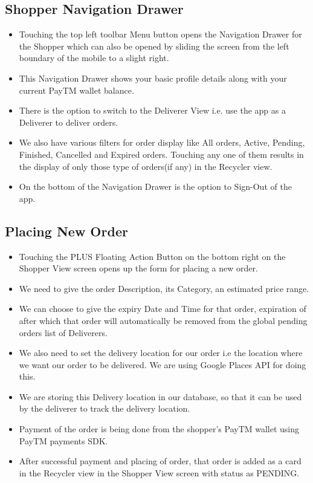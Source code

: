 \documentclass{report}
\begin{document}
\subsection{Shopper Navigation Drawer}
\begin{itemize}
\item Touching the top left toolbar Menu button opens the Navigation Drawer for the Shopper which can also be opened by sliding the screen from the left boundary of the mobile to a slight right.
\item This Navigation Drawer shows your basic profile details along with your current PayTM wallet balance.
\item There is the option to switch to the Deliverer View i.e. use the app as a Deliverer to deliver orders.
\item We also have various filters for order display like All orders, Active, Pending, Finished, Cancelled and Expired orders. Touching any one of them results in the display of only those type of orders(if any) in the Recycler view.
\item On the bottom of the Navigation Drawer is the option to Sign-Out of the app.
\end{itemize}

\subsection{Placing New Order}
\begin{itemize}
\item Touching the PLUS Floating Action Button on the bottom right on the Shopper View screen opens up the form for placing a new order.
\item We need to give the order Description, its Category, an estimated price range.
\item We can choose to give the expiry Date and Time for that order, expiration of after which that order will automatically be removed from the global pending orders list of Deliverers.
\item We also need to set the delivery location for our order i.e the location where we want our order to be delivered. We are using Google Places API for doing this.
\item We are storing this Delivery location in our database, so that it can be used by the deliverer to track the delivery location.
\item Payment of the order is being done from the shopper’s PayTM wallet using PayTM payments SDK.
\item After successful payment and placing of order, that order is added as a card in the Recycler view in the Shopper View screen with status as PENDING.

\end{itemize}
\end{document}
